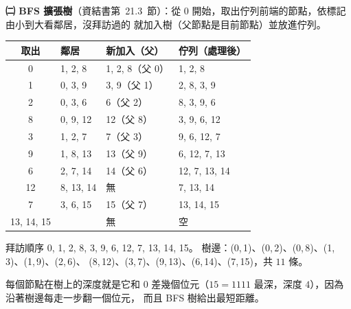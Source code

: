 \begin{pastsoln}
\textbf{㈡ BFS 擴張樹}（資結書第~21.3~節）：從 $0$ 開始，取出佇列前端的節點，依標記由小到大看鄰居，沒拜訪過的
就加入樹（父節點是目前節點）並放進佇列。
\begin{center}
\small
\begin{tabular}{clll}
\toprule
取出 & 鄰居 & 新加入（父） & 佇列（處理後） \\
\midrule
0 & 1, 2, 8 & 1, 2, 8（父 0） & 1, 2, 8 \\
1 & 0, 3, 9 & 3, 9（父 1） & 2, 8, 3, 9 \\
2 & 0, 3, 6 & 6（父 2） & 8, 3, 9, 6 \\
8 & 0, 9, 12 & 12（父 8） & 3, 9, 6, 12 \\
3 & 1, 2, 7 & 7（父 3） & 9, 6, 12, 7 \\
9 & 1, 8, 13 & 13（父 9） & 6, 12, 7, 13 \\
6 & 2, 7, 14 & 14（父 6） & 12, 7, 13, 14 \\
12 & 8, 13, 14 & 無 & 7, 13, 14 \\
7 & 3, 6, 15 & 15（父 7） & 13, 14, 15 \\
13, 14, 15 & & 無 & 空 \\
\bottomrule
\end{tabular}
\end{center}
拜訪順序 0, 1, 2, 8, 3, 9, 6, 12, 7, 13, 14, 15。 樹邊：(0,\,1)、(0,\,2)、(0,\,8)、(1,\,3)、(1,\,9)、(2,\,6)、
(8,\,12)、(3,\,7)、(9,\,13)、(6,\,14)、(7,\,15)，共 $11$ 條。
\begin{center}
\end{center}
每個節點在樹上的深度就是它和 $0$ 差幾個位元（$15 = 1111$ 最深，深度 $4$），因為沿著樹邊每走一步翻一個位元，
而且 BFS 樹給出最短距離。


\end{pastsoln}
